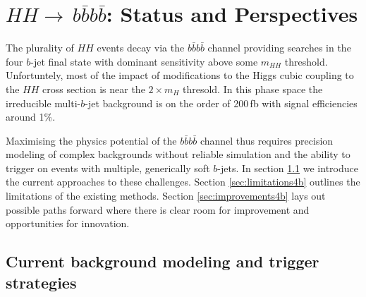
\newcommand*{\ifb}{fb$^{-1}$\xspace}
\newcommand*{\smhh}{SM $HH$\xspace}
\newcommand*{\bbbb}{\ensuremath{b\bar{b}b\bar{b}}\xspace}
\newcommand*{\bb}{\ensuremath{b\bar{b}}\xspace}
\newcommand*{\hh}{\ensuremath{HH}\xspace}
\newcommand*{\bjet}{$b$-jet\xspace}
\newcommand*{\bjets}{$b$-jets\xspace}
\newcommand*{\mhh}{\ensuremath{m_{HH}}\xspace}
\newcommand*{\mh}{\ensuremath{m_{H}}\xspace}

\section{$HH\to\,$\bbbb: Status and Perspectives}
\label{sec:HH4b}
The plurality of \hh events decay via the \bbbb channel providing searches in the four \bjet final state with dominant sensitivity above some \mhh threshold.
Unfortuntely, most of the impact of modifications to the Higgs cubic coupling to the \hh cross section is near the $2\times$\mh thresold.
In this phase space the irreducible multi-\bjet background is on the order of 200$\,$fb with signal efficiencies around 1\%.

Maximising the physics potential of the \bbbb channel thus requires precision modeling of complex backgrounds without reliable simulation
and the ability to trigger on events with multiple, generically soft \bjets. In section \ref{sec:current4b} we introduce the current
approaches to these challenges. Section \ref{sec:limitations4b} outlines the limitations of the existing methods. Section \ref{sec:improvements4b}
lays out possible paths forward where there is clear room for improvement and opportunities for innovation. 

\subsection{Current background modeling and trigger strategies}
\label{sec:current4b}

